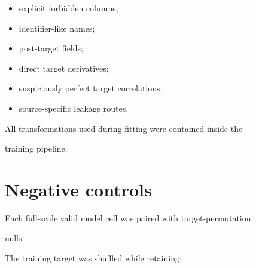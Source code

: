 \documentclass[11pt,a4paper,oneside]{report}
\begin{document}
\begin{itemize}



\item

explicit forbidden columns;



\item

identifier-like names;



\item

post-target fields;



\item

direct target derivatives;



\item

suspiciously perfect target correlations;



\item

source-specific leakage routes.



\end{itemize}



All transformations used during fitting were contained inside the

training pipeline.





\section{Negative controls}



Each full-scale valid model cell was paired with target-permutation

nulls.



The training target was shuffled while retaining:
\end{document}
